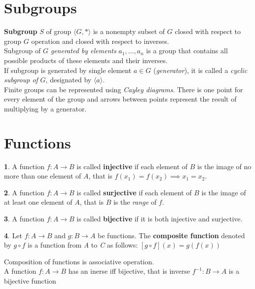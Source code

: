 \documentclass[a4paper,12pt]{article}
\theoremstyle{definition}
\newtheorem{definition}{}[section]
\theoremstyle{axiom}
\theoremstyle{theorem}
\theoremstyle{lemma}
\begin{document}
\section{Subgroups}
\textbf{Subgroup} $S$ of group $\langle G, * \rangle$ is a nonempty subset of $G$ closed with respect to group $G$ operation and closed with respect to inverses.
\\
Subgroup of $G$ \textit{generated by elements} $a_1, \dots ,a_n$ is a group that contains all possible products of these elements and their inverses.
\\
If subgroup is generated by single element $a \in G$ (\textit{generator}), it is called a \textit{cyclic subgroup of} $G$, designated by $\langle a \rangle$.
\\
Finite groups can be represented using \textit{Cayley diagrams}. There is one point for every element of the group and arrows between points represent the result of multiplying by a generator.
\section{Functions}
\begin{definition}
        A function $f : A \to B$ is called \textbf{injective} if each element of $B$ is the image of no more than one element of $A$, that is $f(x_1) = f(x_2) \implies x_1 = x_2$.
\end{definition}
\begin{definition}
        A function $f : A \to B$ is called \textbf{surjective} if each element of $B$ is the image of at least one element of $A$, that is $B$ is the \textit{range} of $f$.
\end{definition}
\begin{definition}
    A function $f: A \to B$ is called \textbf{bijective} if it is both injective and surjective.
\end{definition}
\begin{definition}{}
        \textnormal{Let $f: A \to B $ and  $g: B \to A$ be functions. The \textbf{composite function} denoted by $g \circ f$ is a function from \textit{A} to \textit{C} as follows:
        $[g \circ f](x) = g(f(x))$ }
\end{definition}
Composition of functions is associative operation.
\\
A function $f: A \to B$ has an inerse iff bijective, that is inverse $f^{-1}: B \to A$ is a bijective function
\end{document}
